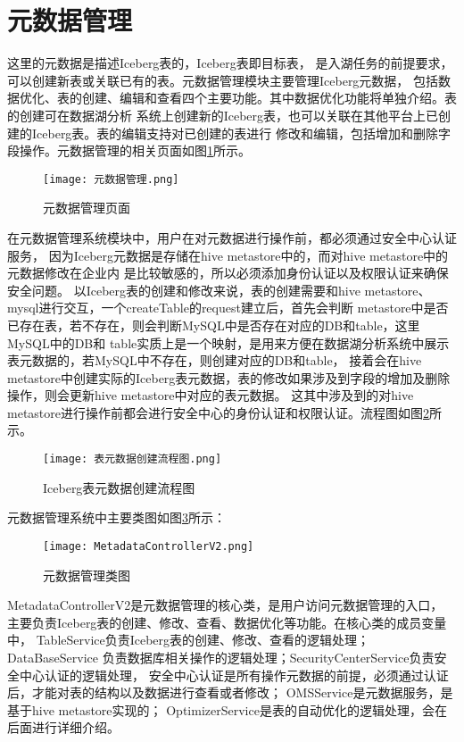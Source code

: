 \section{元数据管理}

这里的元数据是描述Iceberg表的，Iceberg表即目标表，
是入湖任务的前提要求，可以创建新表或关联已有的表。元数据管理模块主要管理Iceberg元数据，
包括数据优化、表的创建、编辑和查看四个主要功能。其中数据优化功能将单独介绍。表的创建可在数据湖分析
系统上创建新的Iceberg表，也可以关联在其他平台上已创建的Iceberg表。表的编辑支持对已创建的表进行
修改和编辑，包括增加和删除字段操作。元数据管理的相关页面如图\ref{fig:元数据管理}所示。

\begin{figure}[H]
  \centering
  \texttt{[image: 元数据管理.png]}
  \caption{元数据管理页面}
  \label{fig:元数据管理}
\end{figure}

在元数据管理系统模块中，用户在对元数据进行操作前，都必须通过安全中心认证服务，
因为Iceberg元数据是存储在hive metastore中的，而对hive metastore中的元数据修改在企业内
是比较敏感的，所以必须添加身份认证以及权限认证来确保安全问题。
以Iceberg表的创建和修改来说，表的创建需要和hive metastore、mysql进行交互，一个createTable的request建立后，首先会判断
metastore中是否已存在表，若不存在，则会判断MySQL中是否存在对应的DB和table，这里MySQL中的DB和
table实质上是一个映射，是用来方便在数据湖分析系统中展示表元数据的，若MySQL中不存在，则创建对应的DB和table，
接着会在hive metastore中创建实际的Iceberg表元数据，表的修改如果涉及到字段的增加及删除操作，则会更新hive metastore中对应的表元数据。
这其中涉及到的对hive metastore进行操作前都会进行安全中心的身份认证和权限认证。流程图如图\ref{fig:表元数据创建流程图}所示。

\begin{figure}[H]
  \centering
  \texttt{[image: 表元数据创建流程图.png]}
  \caption{Iceberg表元数据创建流程图}
  \label{fig:表元数据创建流程图}
\end{figure}

元数据管理系统中主要类图如图\ref{fig:MetadataControllerV2}所示：

\begin{figure}[H]
  \centering
  \texttt{[image: MetadataControllerV2.png]}
  \caption{元数据管理类图}
  \label{fig:MetadataControllerV2}
\end{figure}

MetadataControllerV2是元数据管理的核心类，是用户访问元数据管理的入口，
主要负责Iceberg表的创建、修改、查看、数据优化等功能。在核心类的成员变量中，
TableService负责Iceberg表的创建、修改、查看的逻辑处理；DataBaseService
负责数据库相关操作的逻辑处理；SecurityCenterService负责安全中心认证的逻辑处理，
安全中心认证是所有操作元数据的前提，必须通过认证后，才能对表的结构以及数据进行查看或者修改；
OMSService是元数据服务，是基于hive metastore实现的；
OptimizerService是表的自动优化的逻辑处理，会在后面进行详细介绍。



